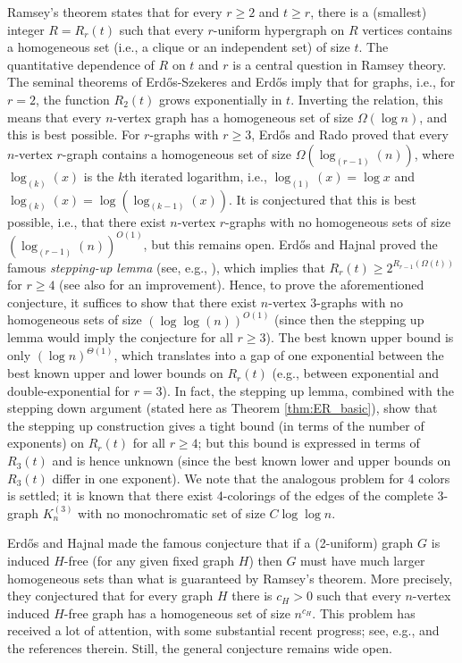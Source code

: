 \documentclass[11pt]{article}
\theoremstyle{plain}
\begin{document}
Ramsey's theorem states that for every $r \geq 2$ and $t \geq r$, there is a (smallest) integer $R = R_r(t)$ such that every $r$-uniform hypergraph on $R$ vertices contains a homogeneous set (i.e., a clique or an independent set) of size $t$. 
The quantitative dependence of $R$ on $t$ and $r$ is a central question in Ramsey theory. 
The seminal theorems of Erd\H{o}s-Szekeres \cite{ES} and Erd\H{o}s \cite{Erdos} imply that for graphs, i.e., for $r=2$, the function $R_2(t)$ grows exponentially in $t$. Inverting the relation, this means that every $n$-vertex graph has a homogeneous set of size $\Omega(\log n)$, and this is best possible. For $r$-graphs with $r \geq 3$, Erd\H{o}s and Rado \cite{ER} proved that every $n$-vertex $r$-graph contains a homogeneous set of size $\Omega(\log_{(r-1)}(n))$, where $\log_{(k)}(x)$ is the $k$th iterated logarithm, i.e., $\log_{(1)}(x) = \log x$ and $\log_{(k)}(x) = \log(\log_{(k-1)}(x))$. 
It is conjectured \cite{EHR} that this is best possible, i.e., that there exist $n$-vertex $r$-graphs with no homogeneous sets of size $(\log_{(r-1)}(n))^{O(1)}$, 
but this remains open. Erd\H{o}s and Hajnal proved the famous {\em stepping-up lemma} (see, e.g., \cite{Ramsey_book}), which implies that $R_r(t) \geq 2^{R_{r-1}(\Omega(t))}$ for $r \geq 4$ (see also \cite{CFS_steppingup} for an improvement). Hence, to prove the aforementioned conjecture, it suffices to show that there exist $n$-vertex $3$-graphs with no homogeneous sets of size 
$(\log\log (n))^{O(1)}$ (since then the stepping up lemma would imply the conjecture for all $r \geq 3$). 
The best known upper bound is only $(\log n)^{\Theta(1)}$, which translates into a gap of one exponential between the best known upper and lower bounds on $R_r(t)$ (e.g., between exponential and double-exponential for $r=3$).
In fact, the stepping up lemma, combined with the stepping down argument (stated here as Theorem \ref{thm:ER_basic}), show that the stepping up construction gives a tight bound (in terms of the number of exponents) on $R_r(t)$ for all $r \geq 4$; but this bound is expressed in terms of $R_3(t)$ and is hence unknown (since the best known lower and upper bounds on $R_3(t)$ differ in one exponent). 
We note that the analogous problem for 4 colors is settled; it is known that there exist 4-colorings of the edges of the complete $3$-graph $K_n^{(3)}$ with no monochromatic set of size $C\log\log n$. 

Erd\H{o}s and Hajnal \cite{EH_Ramsey} made the famous conjecture that if a (2-uniform) graph $G$ is induced $H$-free (for any given fixed graph $H$) then $G$ must have much larger homogeneous sets than what is guaranteed by Ramsey's theorem. More precisely, they conjectured that for every graph $H$ there is $c_H > 0$ such that every $n$-vertex induced $H$-free graph has a homogeneous set of size $n^{c_H}$. This problem has received a lot of attention, with some substantial recent progress; see, e.g., \cite{BNSS,NSS_VC,nguyen2023} and the references therein. Still, the general conjecture remains wide open.
\end{document}
